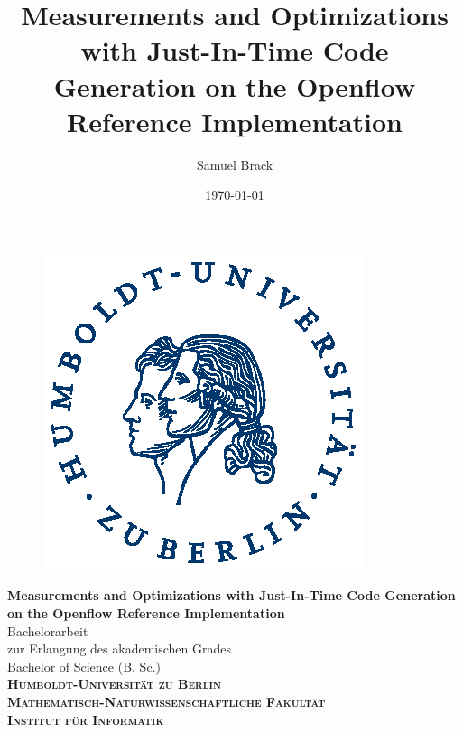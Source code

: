 \documentclass[a4paper,
		12pt,
		parskip=full,
		titlepage
		]{scrartcl}
\title{Measurements and Optimizations with Just-In-Time Code Generation on the Openflow Reference Implementation}
\author{Samuel Brack}
\date{\today}
\begin{document}
\thispagestyle{empty}

\hspace{20cm}
\vspace{-3cm}

\begin{figure}[H] \hspace{11cm}
\includegraphics[width=3.2 cm]{HU_Logo}
\end{figure}
\begin{center}
  \huge{\bf Measurements and Optimizations with Just-In-Time Code Generation on the Openflow Reference Implementation} \\ %
  \vspace{1cm}
  \LARGE  Bachelorarbeit \\ %
  \vspace{1cm}
  \Large zur Erlangung des akademischen Grades \\
  Bachelor of Science (B. Sc.)\\ %
  \vspace{1.5cm}
  {\large
    \bf{
      \scshape
      Humboldt-Universit\"at zu Berlin \\
      Mathematisch-Naturwissenschaftliche Fakult\"at \\
      Institut f\"ur Informatik\\
    }
  } 
\enlargethispage{10\baselineskip}
\end{center}
\vspace {1 cm}%
\end{document}
